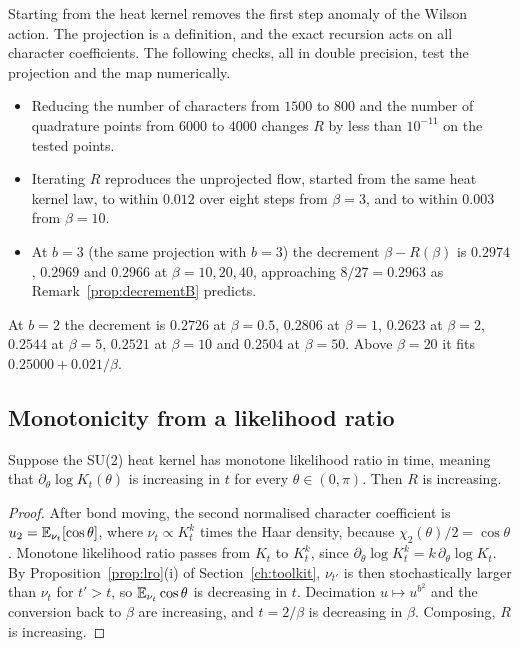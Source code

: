 Starting from the heat kernel removes the first step anomaly of the Wilson action. The projection is a definition, and the exact recursion acts on all character coefficients. The following checks, all in double precision, test the projection and the map numerically.
\begin{itemize}
\item Reducing the number of characters from $1500$ to $800$ and the number of quadrature points from $6000$ to $4000$ changes $R$ by less than $10^{-11}$ on the tested points.
\item Iterating $R$ reproduces the unprojected flow, started from the same heat kernel law, to within $0.012$ over eight steps from $\beta=3$, and to within $0.003$ from $\beta=10$.
\item At $b=3$ (the same projection with $b=3$) the decrement $\beta-R(\beta)$ is $0.2974$, $0.2969$ and $0.2966$ at $\beta=10,20,40$, approaching $8/27=0.2963$ as Remark~\ref{prop:decrementB} predicts.
\end{itemize}
At $b=2$ the decrement is $0.2726$ at $\beta=0.5$, $0.2806$ at $\beta=1$, $0.2623$ at $\beta=2$, $0.2544$ at $\beta=5$, $0.2521$ at $\beta=10$ and $0.2504$ at $\beta=50$. Above $\beta=20$ it fits $0.25000+0.021/\beta$.

\subsection{Monotonicity from a likelihood ratio}

\begin{lemma}\label{lem:mlrB}
Suppose the SU(2) heat kernel has monotone likelihood ratio in time, meaning that $\partial_\theta\log K_t(\theta)$ is increasing in $t$ for every $\theta\in(0,\pi)$. Then $R$ is increasing.
\end{lemma}

\begin{proof}
After bond moving, the second normalised character coefficient is $u_2=\mathbb{E}_{\nu_t}[\cos\theta]$, where $\nu_t\propto K_t^k$ times the Haar density, because $\chi_2(\theta)/2=\cos\theta$. Monotone likelihood ratio passes from $K_t$ to $K_t^k$, since $\partial_\theta\log K_t^k=k\,\partial_\theta\log K_t$. By Proposition~\ref{prop:lro}(i) of Section~\ref{ch:toolkit}, $\nu_{t'}$ is then stochastically larger than $\nu_t$ for $t'>t$, so $\mathbb{E}_{\nu_t}\cos\theta$ is decreasing in $t$. Decimation $u\mapsto u^{b^2}$ and the conversion back to $\beta$ are increasing, and $t=2/\beta$ is decreasing in $\beta$. Composing, $R$ is increasing.
\end{proof}

